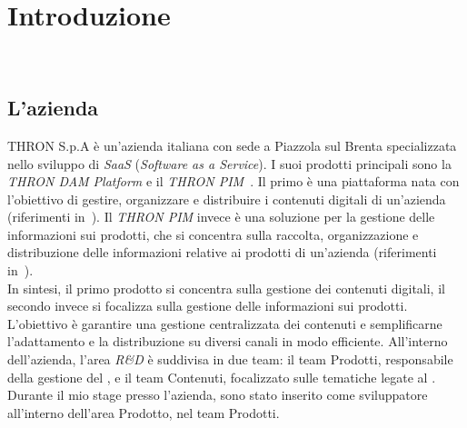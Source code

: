 \chapter{Introduzione}\label{cap:introduzione}

\\

\section{L'azienda}\label{sec:azienda}
THRON S.p.A è un'azienda italiana con sede a Piazzola sul Brenta specializzata nello sviluppo di \textit{SaaS} (\textit{Software as a Service}).
I suoi prodotti principali sono la \textit{THRON DAM Platform} e il \textit{THRON PIM}~\cite{site:thron}. 
Il primo è una piattaforma nata con l'obiettivo di gestire, organizzare e distribuire i contenuti digitali di un'azienda (riferimenti in~\cite{site:dam}).
Il \textit{THRON PIM} invece è una soluzione per la gestione delle informazioni sui prodotti, che si concentra
sulla raccolta, organizzazione e distribuzione delle informazioni relative ai prodotti di un'azienda (riferimenti in~\cite{site:pim}).\\
In sintesi, il primo prodotto si concentra sulla gestione dei contenuti digitali, il secondo invece
si focalizza sulla gestione delle informazioni sui prodotti.
L'obiettivo è garantire una gestione centralizzata dei contenuti e semplificarne l'adattamento e la distribuzione su diversi
canali in modo efficiente.
All'interno dell'azienda, l'area \textit{R\&D} è suddivisa in due team: il team Prodotti, responsabile della gestione
del , e il team Contenuti, focalizzato sulle tematiche legate al .\\
Durante il mio stage presso l'azienda, sono stato inserito come sviluppatore  all'interno dell'area Prodotto, nel team Prodotti.

